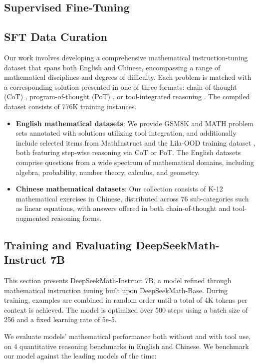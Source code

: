 \begin{itemize}[topsep=0pt]
\section{Supervised Fine-Tuning}

\subsection{SFT Data Curation}

Our work involves developing a comprehensive mathematical instruction-tuning dataset that spans both English and Chinese, encompassing a range of mathematical disciplines and degrees of difficulty. Each problem is matched with a corresponding solution presented in one of three formats: chain-of-thought (CoT) \citep{cot}, program-of-thought (PoT) \citep{pot,pal}, or tool-integrated reasoning \citep{tora}. The compiled dataset consists of 776K training instances.

\begin{itemize}[topsep=0pt]
    \item \textbf{English mathematical datasets}: We provide GSM8K and MATH problem sets annotated with solutions utilizing tool integration, and additionally include selected items from MathInstruct \citep{MathInstruct} and the Lila-OOD training dataset \citep{lila}, both featuring step-wise reasoning via CoT or PoT. The English datasets comprise questions from a wide spectrum of mathematical domains, including algebra, probability, number theory, calculus, and geometry.
    \item \textbf{Chinese mathematical datasets}: Our collection consists of K-12 mathematical exercises in Chinese, distributed across 76 sub-categories such as linear equations, with answers offered in both chain-of-thought and tool-augmented reasoning forms.
\end{itemize}

\subsection{Training and Evaluating DeepSeekMath-Instruct 7B}

This section presents DeepSeekMath-Instruct 7B, a model refined through mathematical instruction tuning built upon DeepSeekMath-Base. During training, examples are combined in random order until a total of 4K tokens per context is achieved. The model is optimized over 500 steps using a batch size of 256 and a fixed learning rate of 5e-5.

We evaluate models' mathematical performance both without and with tool use, on 4 quantitative reasoning benchmarks in English and Chinese. We benchmark our model against the leading models of the time:


\end{itemize}
